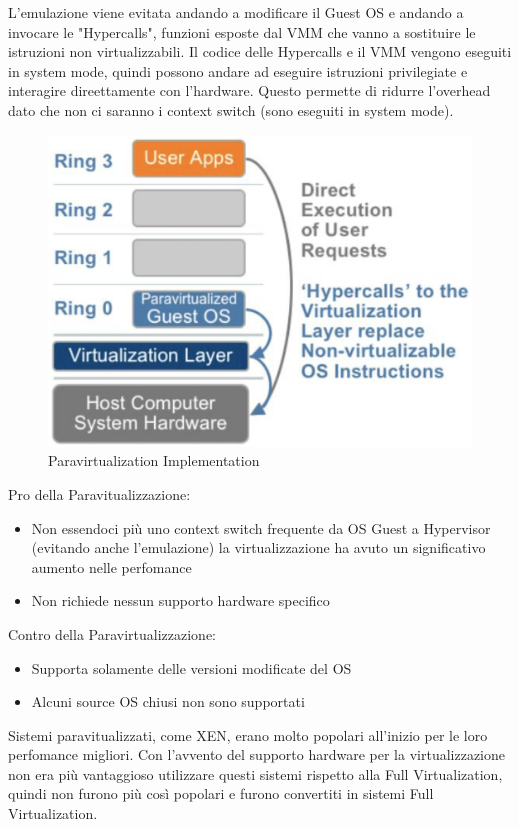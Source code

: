 \documentclass{article}
\begin{document}
L'emulazione viene evitata andando a modificare il Guest OS e andando a invocare le "Hypercalls", funzioni esposte dal VMM che vanno a sostituire le istruzioni non virtualizzabili. Il codice delle Hypercalls e il VMM vengono eseguiti in system mode, quindi possono andare ad eseguire istruzioni privilegiate e interagire direettamente con l'hardware. Questo permette di ridurre l'overhead dato che non ci saranno i context switch (sono eseguiti in system mode).
\begin{figure}[H]
\centering
\includegraphics[scale=0.5]{img/Virt_tech/18.png}
\caption{Paravirtualization Implementation}
\end{figure}
Pro della Paravitualizzazione:
\begin{itemize}
    \item Non essendoci più uno context switch frequente da OS Guest a Hypervisor (evitando anche l'emulazione) la virtualizzazione ha avuto un significativo aumento nelle perfomance
    \item Non richiede nessun supporto hardware specifico
\end{itemize}
Contro della Paravirtualizzazione:
\begin{itemize}
    \item Supporta solamente delle versioni modificate del OS
    \item Alcuni source OS chiusi non sono supportati
\end{itemize}
Sistemi paravitualizzati, come XEN, erano molto popolari all'inizio per le loro perfomance migliori. Con l'avvento del supporto hardware per la virtualizzazione non era più vantaggioso utilizzare questi sistemi rispetto alla Full Virtualization, quindi non furono più così popolari e furono convertiti in sistemi Full Virtualization.\\ \\
\end{document}

